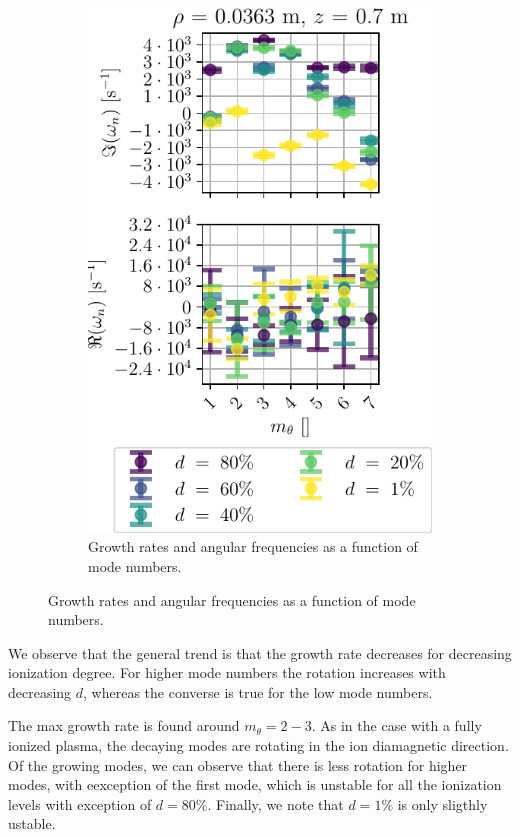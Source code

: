 \begin{figure}[htbp]
\begin{subfigure}[h]{0.45\textwidth}
        \centering
        \includegraphics{fig/results/neutral/growthRatesNnScan}
        \caption{Growth rates and angular frequencies as a function of mode numbers.}
        \label{fig:grNn}
    \end{subfigure}%
\end{figure}
%
We observe that the general trend is that the growth rate decreases for decreasing ionization degree.
For higher mode numbers the rotation increases with decreasing $d$, whereas the converse is true for the low mode numbers.

The max growth rate is found around $m_\theta=2-3$.
As in the case with a fully ionized plasma, the decaying modes are rotating in the ion diamagnetic direction.
Of the growing modes, we can observe that there is less rotation for higher modes, with eexception of the first mode, which is unstable for all the ionization levels with exception of $d=80\%$.
Finally, we note that $d=1\%$ is only sligthly ustable.

